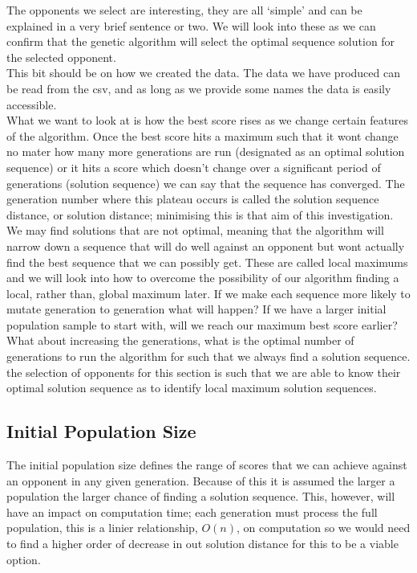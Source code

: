     The opponents we select are interesting, they are all `simple' and can be explained in a very brief sentence or two. We will look into these as we can confirm that the genetic algorithm will select the optimal sequence solution for the selected opponent. \\


    This bit should be on how we created the data. The data we have produced can be read from the csv, and as long as we provide some names the data is easily accessible.\\

    What we want to look at is how the best score rises as we change certain features of the algorithm. Once the best score hits a maximum such that it wont change no mater how many more generations are run (designated as an optimal solution sequence) or it hits a score which doesn't change over a significant period of generations (solution sequence) we can say that the sequence has converged. The generation number where this plateau occurs is called the solution sequence distance, or solution distance; minimising this is that aim of this investigation.
    We may find solutions that are not optimal, meaning that the algorithm will narrow down a sequence that will do well against an opponent but wont actually find the best sequence that we can possibly get. These are called local maximums and we will look into how to overcome the possibility of our algorithm finding a local, rather than, global maximum later.
    If we make each sequence more likely to mutate generation to generation what will happen? If we have a larger initial population sample to start with, will we reach our maximum best score earlier? What about increasing the generations, what is the optimal number of generations to run the algorithm for such that we always find a solution sequence.
    the selection of opponents for this section is such that we are able to know their optimal solution sequence as to identify local maximum solution sequences.\\ 

    \subsection{Initial Population Size}
    
    The initial population size defines the range of scores that we can achieve against an opponent in any given generation. Because of this it is assumed the larger a population the larger chance of finding a solution sequence. This, however, will have an impact on computation time; each generation must process the full population, this is a linier relationship, \(O(n)\), on computation so we would need to find a higher order of decrease in out solution distance for this to be a viable option.
    
